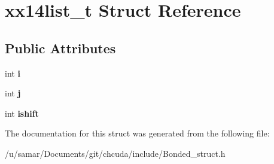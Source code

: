 \hypertarget{structxx14list__t}{}\section{xx14list\+\_\+t Struct Reference}
\label{structxx14list__t}
\subsection*{Public Attributes}
\begin{DoxyCompactItemize}
\item 
\hypertarget{structxx14list__t_a8642f420ee0c2d7a5e4bc8892a7bfa6c}{}\label{structxx14list__t_a8642f420ee0c2d7a5e4bc8892a7bfa6c} 
int {\bfseries i}
\item 
\hypertarget{structxx14list__t_ad24b39dec5600fbd9840ddab92f05fab}{}\label{structxx14list__t_ad24b39dec5600fbd9840ddab92f05fab} 
int {\bfseries j}
\item 
\hypertarget{structxx14list__t_add18a6a25bc2821313835e733d9e789d}{}\label{structxx14list__t_add18a6a25bc2821313835e733d9e789d} 
int {\bfseries ishift}
\end{DoxyCompactItemize}


The documentation for this struct was generated from the following file\+:\begin{DoxyCompactItemize}
\item 
/u/samar/\+Documents/git/chcuda/include/Bonded\+\_\+struct.\+h\end{DoxyCompactItemize}
